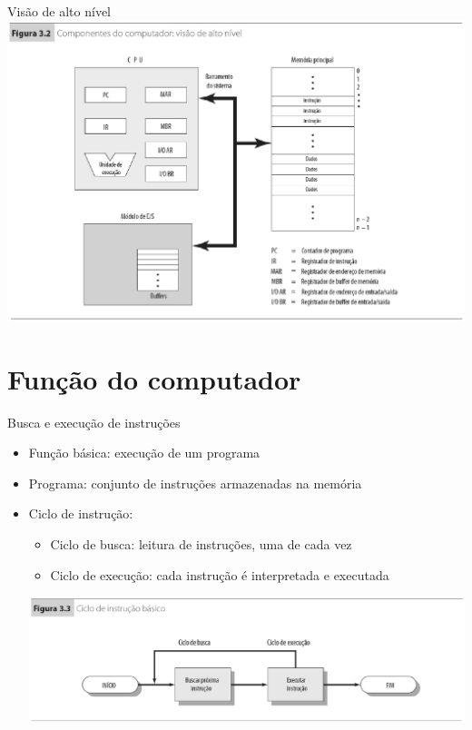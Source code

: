 \begin{slide}{Visão de alto nível}
   \centering
   \includegraphics[scale=0.95]{figs/altonivel.eps}
\end{slide}

\section[slide=true]{Função do computador}
\begin{slide}{Busca e execução de instruções}
\begin{itemize}
   \item Função básica: execução de um programa
   \item Programa: conjunto de instruções armazenadas na memória
   \item Ciclo de instrução:
   \begin{itemize}
      \item Ciclo de busca: leitura de instruções, uma de cada vez
      \item Ciclo de execução: cada instrução é interpretada e executada\pause
   \end{itemize}
   \includegraphics[width=\textwidth]{figs/cicloinstrucao.eps}
\end{itemize}
\end{slide}

